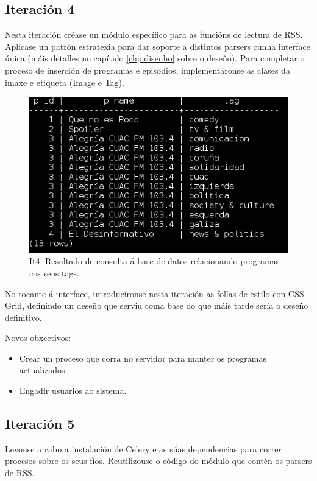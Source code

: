 \subsection{Iteración 4}

Nesta iteración créase un módulo específico para as funcións de lectura de RSS. Aplícase un patrón estratexia para dar soporte a distintos parsers cunha interface única (máis detalles no capítulo \ref{chp:disenho} sobre o deseño). Para completar o proceso de inserción de programas e episodios, implementáronse as clases da imaxe e etiqueta (Image e Tag).

\begin{figure}[h]
	\centering
	\includegraphics[scale=0.6,keepaspectratio=true]{./images/tags.png}
	\caption{It4: Resultado de consulta á base de datos relacionando programas cos seus tags.}
	\label{fig:it4_tag}
\end{figure}

No tocante á interface, introducíronse nesta iteración as follas de estilo con CSS-Grid, definindo un deseño que serviu coma base do que máis tarde sería o deseño definitivo.

Novos obxectivos:

\begin{itemize}
	\item Crear un proceso que corra no servidor para manter os programas actualizados.
	\item Engadir usuarios ao sistema. 
\end{itemize}

\subsection{Iteración 5}

Levouse a cabo a instalación de Celery e as súas dependencias para correr procesos sobre os seus fíos. Reutilizouse o código do módulo que contén os parsers de RSS. 

